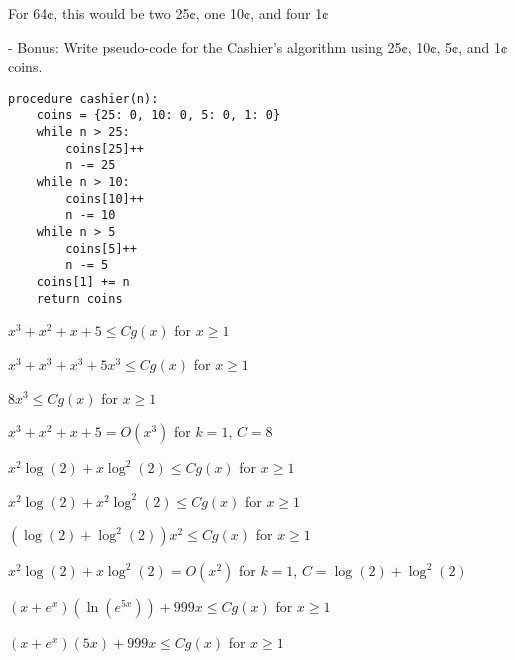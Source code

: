 \documentclass{exam}
\begin{document}
\begin{questions}
{\begin{center}
For 64¢, this would be two 25¢, one 10¢, and four 1¢ 

\end{center}

- Bonus: Write pseudo-code for the Cashier's algorithm using 25¢, 10¢, 5¢, and 1¢ coins.}

\begin{center}

\begin{verbatim}
procedure cashier(n):
    coins = {25: 0, 10: 0, 5: 0, 1: 0}
    while n > 25:
        coins[25]++
        n -= 25
    while n > 10:
        coins[10]++
        n -= 10
    while n > 5
        coins[5]++
        n -= 5
    coins[1] += n
    return coins
\end{verbatim}

\end{center}

\newpage

\begin{subparts}

\begin{center}
\( x^3 + x^2 + x + 5 \leq Cg(x) \) for \(x \geq 1\)

\( x^3 + x^3 + x^3 + 5x^3 \leq Cg(x) \) for \(x \geq 1\)

\( 8x^3 \leq Cg(x) \) for \(x \geq 1\)

\( x^3 + x^2 + x + 5 = O(x^3)\) for \(k = 1\), \(C = 8\)
\end{center}


\begin{center}
\( x^2\log(2) + x\log^2(2) \leq Cg(x) \) for \(x \geq 1\)

\( x^2\log(2) + x^2\log^2(2) \leq Cg(x) \) for \(x \geq 1\)

\( (\log(2) + \log^2(2))x^2 \leq Cg(x) \) for \(x \geq 1\)

\( x^2\log(2) + x\log^2(2) = O(x^2)\) for \(k = 1\), \(C = \log(2) + \log^2(2)\)
\end{center}


\begin{center}
\( (x + e^x)(\ln(e^{5x})) + 999x \leq Cg(x) \) for \(x \geq 1\)

\( (x + e^x)(5x) + 999x \leq Cg(x) \) for \(x \geq 1\)


\end{center}
\end{subparts}
\end{questions}
\end{document}
